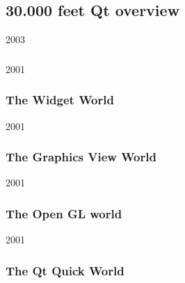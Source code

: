 %
%
%
%

\subsection{30.000 feet Qt overview}

\begin{slide}{2003}\frametitle{}
\vspace*{20mm}

\end{slide}


\begin{slide}{2001}\frametitle{The Widget World}

\end{slide}


\begin{slide}{2001}\frametitle{The Graphics View World}

\end{slide}


\begin{slide}{2001}\frametitle{The Open GL world}

\end{slide}


\begin{slide}{2001}\frametitle{The Qt Quick World}
\vspace*{15mm}

\end{slide}

